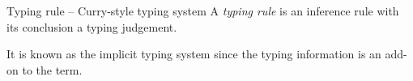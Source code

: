 \begin{frame}{Typing rule -- Curry-style typing system}
  A \emph{typing rule} is an inference rule with its conclusion a
  typing judgement.
  
  \begin{prooftree}
  \end{prooftree}
  \begin{prooftree}
  \end{prooftree}
  \begin{prooftree}
  \end{prooftree}

It is known as the \alert{implicit typing} system since the typing information is an add-on to the term.
\end{frame}


%
%

